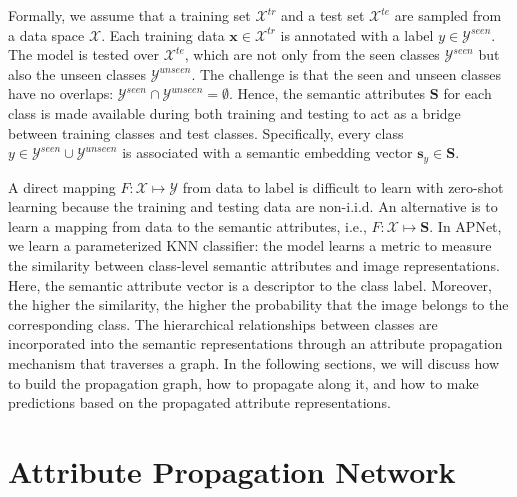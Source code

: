 \documentclass[letterpaper]{article}
\def\vs{{\bm{s}}}
\def\vx{{\bm{x}}}
\def\mS{{\bm{S}}}
\begin{document}
Formally, we assume that a training set $\mathcal{X}^{tr}$ and a test set $\mathcal{X}^{te}$ are sampled from a data space $\mathcal X$. Each training data $\vx \in \mathcal{X}^{tr}$
is annotated with a label $y \in \mathcal{Y}^{seen}$.
The model is tested over $\mathcal{X}^{te}$, which are not only from the seen classes $\mathcal{Y}^{seen}$ but also the unseen classes $\mathcal{Y}^{unseen}$.
The challenge is that the seen and unseen classes have no overlaps: $\mathcal{Y}^{seen} \cap \mathcal{Y}^{unseen} = \emptyset$.
Hence, the semantic attributes $\mS$ for each class is made available during both training and testing to act as a bridge between training classes and test classes. Specifically, every class $y \in \mathcal{Y}^{seen} \cup \mathcal{Y}^{unseen} $ is associated with a semantic embedding vector $\vs_y \in \mS$.


A direct mapping $F:\mathcal X \mapsto \mathcal{Y}$ from data to label is difficult to learn with zero-shot learning because the training and testing data are non-i.i.d. An alternative is to learn a mapping from data to the semantic attributes, i.e., $F:\mathcal{X}\mapsto\mS$. In APNet, we learn a parameterized KNN classifier: the model learns a metric to measure the similarity between class-level semantic attributes and image representations. Here, the semantic attribute vector is a descriptor to the class label. Moreover, the higher the similarity, the higher the probability that the image belongs to the corresponding class. The hierarchical relationships between classes are incorporated into the semantic representations through an attribute propagation mechanism that traverses a graph. In the following sections, we will discuss how to build the propagation graph, how to propagate along it, and how to make predictions based on the propagated attribute representations.















\section{Attribute Propagation Network}
\label{model}
\end{document}
